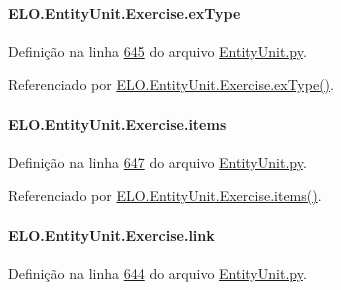 \paragraph[{ex\+Type}]{\setlength{\rightskip}{0pt plus 5cm}E\+L\+O.\+Entity\+Unit.\+Exercise.\+ex\+Type}\label{classELO_1_1EntityUnit_1_1Exercise_af982926b59b32980803f93f40b383d77}


Definição na linha \hyperlink{EntityUnit_8py_source_l00645}{645} do arquivo \hyperlink{EntityUnit_8py_source}{Entity\+Unit.\+py}.



Referenciado por \hyperlink{classELO_1_1EntityUnit_1_1Exercise_a86a71841ee762b2e85da2222baa19b55}{E\+L\+O.\+Entity\+Unit.\+Exercise.\+ex\+Type()}.

\hypertarget{classELO_1_1EntityUnit_1_1Exercise_a14ec766ff723672be49ea5c9438744c8}{}
\paragraph[{items}]{\setlength{\rightskip}{0pt plus 5cm}E\+L\+O.\+Entity\+Unit.\+Exercise.\+items}\label{classELO_1_1EntityUnit_1_1Exercise_a14ec766ff723672be49ea5c9438744c8}


Definição na linha \hyperlink{EntityUnit_8py_source_l00647}{647} do arquivo \hyperlink{EntityUnit_8py_source}{Entity\+Unit.\+py}.



Referenciado por \hyperlink{classELO_1_1EntityUnit_1_1Exercise_a9f3c7f7e3d3b9bdbb6a2cf4ed5d412bb}{E\+L\+O.\+Entity\+Unit.\+Exercise.\+items()}.

\hypertarget{classELO_1_1EntityUnit_1_1Exercise_a13a9382d9126f07ab380ea11df276ed8}{}
\paragraph[{link}]{\setlength{\rightskip}{0pt plus 5cm}E\+L\+O.\+Entity\+Unit.\+Exercise.\+link}\label{classELO_1_1EntityUnit_1_1Exercise_a13a9382d9126f07ab380ea11df276ed8}


Definição na linha \hyperlink{EntityUnit_8py_source_l00644}{644} do arquivo \hyperlink{EntityUnit_8py_source}{Entity\+Unit.\+py}.



